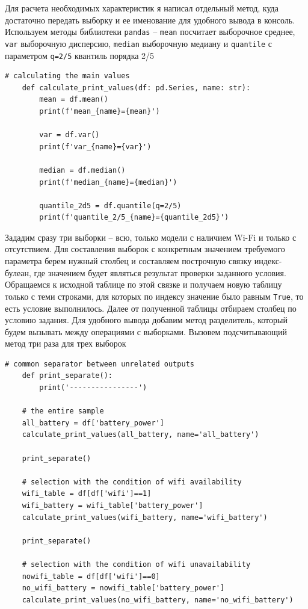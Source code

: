 \documentclass[a4paper, 12pt]{article}
\begin{document}
    Для расчета необходимых характеристик я написал отдельный метод, куда достаточно
    передать выборку и ее именование для удобного вывода в консоль. Используем методы
    библиотеки \texttt{pandas} -- \texttt{mean} посчитает выборочное среднее,
    \texttt{var} выборочную дисперсию, \texttt{median} выборочную медиану и \texttt{quantile}
    с параметром \texttt{q=2/5} квантиль порядка 2/5
    \begin{lstlisting}[label=mvals, caption={Код для подсчета основных характеристик}]
    # calculating the main values
    def calculate_print_values(df: pd.Series, name: str):
        mean = df.mean()
        print(f'mean_{name}={mean}')
        
        var = df.var()
        print(f'var_{name}={var}')
        
        median = df.median()
        print(f'median_{name}={median}')
        
        quantile_2d5 = df.quantile(q=2/5)
        print(f'quantile_2/5_{name}={quantile_2d5}')
    \end{lstlisting}


    Зададим сразу три выборки -- всю, только модели с наличием Wi-Fi и только с отсутствием.
    Для составления выборок с конкретным значением требуемого параметра берем нужный столбец
    и составляем построчную связку индекс-булеан, где значением будет являться результат проверки заданного условия.
    Обращаемся к исходной таблице по этой связке и получаем новую таблицу только с теми строками, для которых по индексу
    значение было равным \texttt{True}, то есть условие выполнилось. Далее от полученной таблицы отбираем столбец по условию задания.
    Для удобного вывода добавим метод разделитель, который будем вызывать между операциями с выборками.
    Вызовем подсчитывающий метод три раза для трех выборок
    \begin{lstlisting}[label=mvals2, caption={Подготовка для удобного и быстрого получения результатов}]
    # common separator between unrelated outputs
    def print_separate():
        print('----------------')

    # the entire sample
    all_battery = df['battery_power']
    calculate_print_values(all_battery, name='all_battery')

    print_separate()

    # selection with the condition of wifi availability
    wifi_table = df[df['wifi']==1]
    wifi_battery = wifi_table['battery_power']
    calculate_print_values(wifi_battery, name='wifi_battery')

    print_separate()

    # selection with the condition of wifi unavailability
    nowifi_table = df[df['wifi']==0]
    no_wifi_battery = nowifi_table['battery_power']
    calculate_print_values(no_wifi_battery, name='no_wifi_battery')
    \end{lstlisting}
\end{document}
